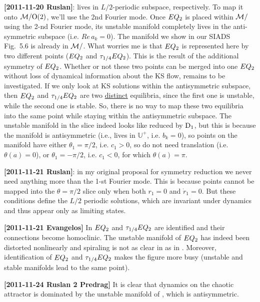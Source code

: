 \begin{description}
{\bf [2011-11-20 Ruslan]}:
 lives in $L/2$-periodic subspace, respectively.  To map it onto
$\mathcal{M}/\textrm{O}(2)$, we'll use the 2nd Fourier mode.
Once
$EQ_{2}$ is placed within $\mathcal{M}/$ using the 2-nd Fourier
mode, its unstable manifold completely lives in the
anti-symmetric subspace (i.e. $Re\,a_k = 0$).
The manifold we show in our SIADS Fig.~5.6 is already in
$\mathcal{M}/$.  What worries me is that $EQ_{2}$ is represented
here by two different points ($EQ_{2}$ and
$\tau_{1/4}EQ_{2}$).  This is the result of the additional
symmetry of $EQ_{2}$.  Whether or not these two points can
be merged into one $EQ_{2}$ without loss of dynamical
information about the KS flow, remains to be investigated.
If we only look at KS solutions within the antisymmetric subspace, then
$EQ_{2}$ and $\tau_{1/4}EQ_{2}$ are two \underline{distinct}
equilibria, since the first one is unstable, while the second one is
stable.  So, there is no way to map these two equilibria into the same
point while staying within the antisymmetric subspace.
The  unstable manifold in the slice indeed looks like reduced
by $\textrm{D}_{1}$, but this is because the manifold is antisymmetric (i.e., lives
in $\mathbb{U}^+$, i.e. $b_k = 0$), so points on the manifold have either
$\theta_1 = \pi/2$, i.e. $c_1 > 0$, so do not need translation (i.e.
$\theta(a) = 0$), or $\theta_1 = -\pi/2$, i.e. $c_1 < 0$, for which
$\theta(a) = \pi$.

{\bf [2011-11-21 Ruslan]}:
in my original proposal for 
    symmetry reduction we never need anything more than the 1-st Fourier
    mode.  This is because points cannot be mapped into the $\theta =
    \pi/2$ slice only when both $r_1 = 0$ and $\dot{r}_1 = 0$.  But these
    conditions define the $L/2$ periodic solutions, which are invariant
    under \KS dynamics and thus appear only as limiting states.

{\bf [2011-11-21 Evangelos]} In 
$EQ_{2}$ and $\tau_{1/4} EQ_{2}$ are identified
and their connections become homoclinic. The unstable manifold of
$EQ_{2}$ has indeed been distorted nonlinearly and spiraling is not as
clear in  as in . Moreover,
identification of $EQ_{2}$ and $\tau_{1/4} EQ_{2}$ makes the figure
more busy (unstable and stable manifolds lead to the same point).

{\bf [2011-11-24 Ruslan 2 Predrag]}
It is clear that dynamics on the chaotic attractor is dominated by the
unstable manifold of , which is antisymmetric.


\end{description}
